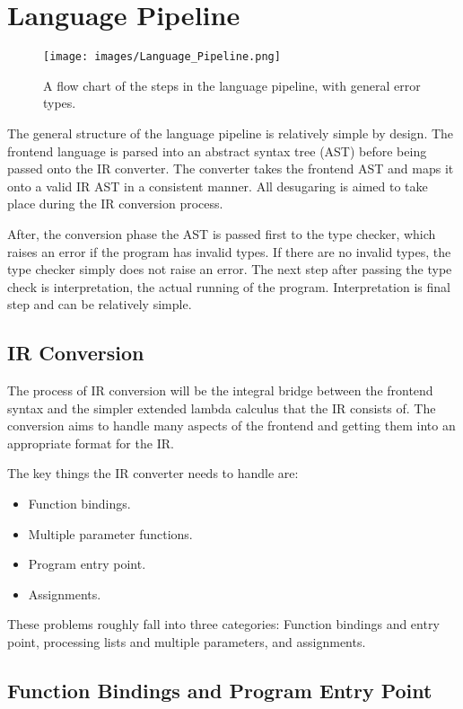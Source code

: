 \documentclass{l4proj}
\begin{document}
\section{Language Pipeline}

\begin{figure}[h]
    \texttt{[image: images/Language\_Pipeline.png]}
    \caption{A flow chart of the steps in the language pipeline, with general error types.}
\end{figure}


The general structure of the language pipeline is relatively simple by design.
The frontend language is parsed into an abstract syntax tree (AST) before being passed onto the IR converter.
The converter takes the frontend AST and maps it onto a valid IR AST in a consistent manner.
All desugaring is aimed to take place during the IR conversion process.

After, the conversion phase the AST is passed first to the type checker, which raises an error if the program has invalid types.
If there are no invalid types, the type checker simply does not raise an error.
The next step after passing the type check is interpretation, the actual running of the program.
Interpretation is final step and can be relatively simple.


\subsection{IR Conversion}
\label{sec:ir-conversion}

The process of IR conversion will be the integral bridge between the frontend syntax and the simpler extended lambda calculus that the IR consists of.
The conversion aims to handle many aspects of the frontend and getting them into an appropriate format for the IR.

The key things the IR converter needs to handle are:
\begin{itemize}
    \item Function bindings.
    \item Multiple parameter functions.
    \item Program entry point.
    \item Assignments.
\end{itemize}

These problems roughly fall into three categories: Function bindings and entry point, processing lists and multiple parameters, and assignments.

\subsection*{Function Bindings and Program Entry Point}
\end{document}
